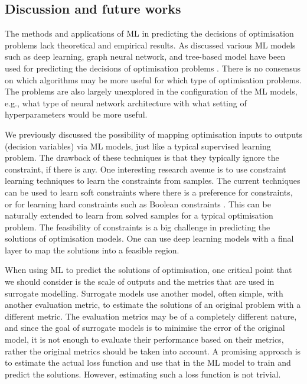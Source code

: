 \documentclass[graybox]{svmult}
\begin{document}
\subsection{Discussion and future works}\label{sec:discussion2}

The methods and applications of ML in predicting the decisions of optimisation problems lack theoretical and empirical results. As discussed various ML models such as deep learning, graph neural network, and tree-based model have been used for predicting the decisions of optimisation problems \cite{abolghasemi2021effectively}. There is no consensus on which algorithms may be more useful for which type of optimisation problems. The problems are also largely unexplored in the configuration of the ML models, e.g., what type of neural network architecture with what setting of hyperparameters would be more useful.  

We previously discussed the possibility of mapping optimisation inputs to outputs (decision variables) via ML models, just like a typical supervised learning problem. The drawback of these techniques is that they typically ignore the constraint, if there is any. One interesting research avenue is to use constraint learning techniques to learn the constraints from samples. The current techniques can be used to learn soft constraints where there is a preference for constraints, or for learning hard constraints such as Boolean constraints \cite{de2018learning}. This can be naturally extended to learn from solved samples for a typical optimisation problem. The feasibility of constraints is a big challenge in predicting the solutions of optimisation models. One can use deep learning models with a final layer to map the solutions into a feasible region. 

When using ML to predict the solutions of optimisation, one critical point that we should consider is the scale of outputs and the metrics that are used in surrogate modelling. Surrogate models use another model, often simple, with another evaluation metric, to estimate the solutions of an original problem with a different metric. The evaluation metrics may be of a completely different nature, and since the goal of surrogate models is to minimise the error of the original model, it is not enough to evaluate their performance based on their metrics, rather the original metrics should be taken into account. A promising approach is to estimate the actual loss function and use that in the ML model to train and predict the solutions. However, estimating such a loss function is not trivial.
\end{document}
